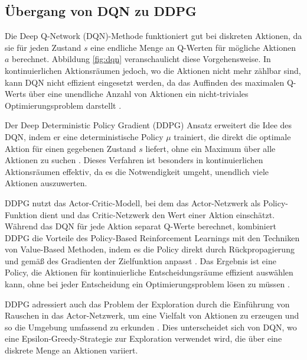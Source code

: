 \subsection{Übergang von DQN zu DDPG}

Die Deep Q-Network (DQN)-Methode funktioniert gut bei diskreten Aktionen, da sie für jeden Zustand \( s \) eine endliche Menge an Q-Werten für mögliche Aktionen \( a \) berechnet. Abbildung \ref{fig:dqn} veranschaulicht diese Vorgehensweise. In kontinuierlichen Aktionsräumen jedoch, wo die Aktionen nicht mehr zählbar sind, kann DQN nicht effizient eingesetzt werden, da das Auffinden des maximalen Q-Werts über eine unendliche Anzahl von Aktionen ein nicht-triviales Optimierungsproblem darstellt \cite{aggarwal2018neural}.

Der Deep Deterministic Policy Gradient (DDPG) Ansatz erweitert die Idee des DQN, indem er eine deterministische Policy \( \mu \) trainiert, die direkt die optimale Aktion für einen gegebenen Zustand \( s \) liefert, ohne ein Maximum über alle Aktionen zu suchen \cite{Wu2018AggregatedMultiDDPG}. Dieses Verfahren ist besonders in kontinuierlichen Aktionsräumen effektiv, da es die Notwendigkeit umgeht, unendlich viele Aktionen auszuwerten.

DDPG nutzt das Actor-Critic-Modell, bei dem das Actor-Netzwerk als Policy-Funktion dient und das Critic-Netzwerk den Wert einer Aktion einschätzt. Während das DQN für jede Aktion separat Q-Werte berechnet, kombiniert DDPG die Vorteile des Policy-Based Reinforcement Learnings mit den Techniken von Value-Based Methoden, indem es die Policy direkt durch Rückpropagierung und gemäß des Gradienten der Zielfunktion anpasst \cite{morales2020grokking}. Das Ergebnis ist eine Policy, die Aktionen für kontinuierliche Entscheidungsräume effizient auswählen kann, ohne bei jeder Entscheidung ein Optimierungsproblem lösen zu müssen \cite{Wu2018AggregatedMultiDDPG}.

DDPG adressiert auch das Problem der Exploration durch die Einführung von Rauschen in das Actor-Netzwerk, um eine Vielfalt von Aktionen zu erzeugen und so die Umgebung umfassend zu erkunden \cite{morales2020grokking}. Dies unterscheidet sich von DQN, wo eine Epsilon-Greedy-Strategie zur Exploration verwendet wird, die über eine diskrete Menge an Aktionen variiert.


